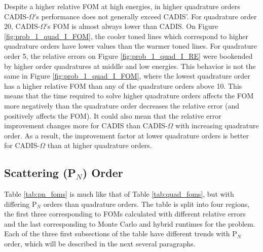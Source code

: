 Despite a higher relative FOM at high energies, in higher quadrature orders
CADIS-$\Omega$'s performance does not generally exceed CADIS'. For quadrature
order 20, CADIS-$\Omega$'s FOM is almost always lower than CADIS. On Figure
\ref{fig:prob_1_quad_I_FOM}, the cooler toned lines which correspond to higher
quadrature orders have lower values than the warmer toned lines.
For quadrature order 5,
the relative errors on Figure \ref{fig:prob_1_quad_I_RE} were bookended by
higher order quadratures at middle and low energies. This behavior is not the
same in Figure \ref{fig:prob_1_quad_I_FOM}, where the lowest quadrature order
has a higher relative FOM than any of the quadrature orders above 10. This means
that the time required to solve higher quadrature orders affects the FOM more
negatively than the quadrature order decreases the relative error (and
positively affects the FOM). It could also mean that the relative error
improvement changes more for CADIS than CADIS-$\Omega$ with increasing
quadrature order. As a result, the improvement factor at lower quadrature orders
is better for CADIS-$\Omega$ than at higher quadrature orders.

%
%
%
%
%
%
%

\subsection{Scattering (P$_N$) Order}
\label{subsec:pnorder}

Table \ref{tab:pn_foms} is much like that of Table \ref{tab:quad_foms}, but with
differing P$_N$ orders than quadrature orders. The table is split into four
regions, the first three corresponding to FOMs calculated with
different relative errors and the last corresponding to Monte Carlo and hybrid
runtimes for the problem. Each of the three first subsections of the table have
different trends with P$_N$ order, which will be described in the next several
paragraphs.

